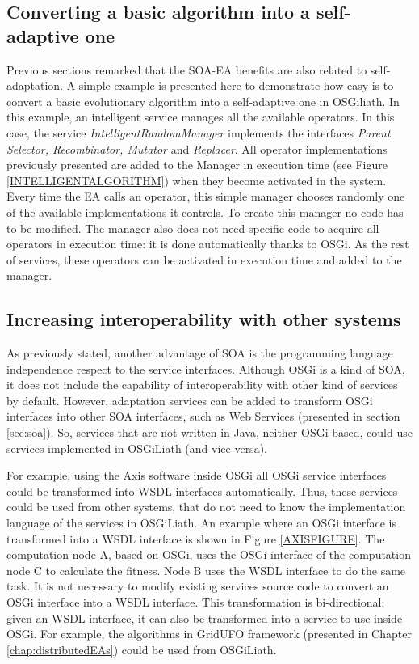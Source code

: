 \subsection{Converting a basic algorithm into a self-adaptive one}

Previous sections remarked that the SOA-EA benefits are also related to self-adaptation. A simple example is presented here to demonstrate how easy is to convert a basic evolutionary algorithm into a self-adaptive one in OSGiliath. In this example, an intelligent service manages all the available operators. In this case, the service {\em IntelligentRandomManager} implements the interfaces {\em Parent Selector, Recombinator, Mutator} and {\em Replacer}. All operator implementations previously presented are added to the Manager in execution time (see Figure \ref{INTELLIGENTALGORITHM}) when they become activated in the system. Every time the EA calls an operator, this simple manager chooses randomly one of the available implementations it controls. To create this manager no code has to be modified. The manager also does not need specific code to acquire all operators in execution time: it is done automatically thanks to OSGi. As the rest of services, these operators can be activated in execution time and added to the manager. 



\subsection{Increasing interoperability with other systems}

As previously stated, another advantage of SOA is the programming language independence respect to the service interfaces. Although OSGi is a kind of SOA, it does not include  the capability of interoperability with other kind of services by default. However, adaptation services can be added to transform OSGi interfaces into other SOA interfaces, such as Web Services (presented in section \ref{sec:soa}). So, services that are not written in Java, neither OSGi-based, could use services implemented in OSGiLiath (and vice-versa).

For example, using the Axis software inside OSGi all OSGi service interfaces could be transformed into WSDL interfaces automatically. Thus, these services could be used from other systems, that do not need to know the implementation language of the services in OSGiLiath. An example where an OSGi interface is transformed into a WSDL interface is shown in Figure \ref{AXISFIGURE}. The computation node A, based on OSGi, uses the OSGi interface of the computation node C to calculate the fitness. Node B uses the WSDL interface to do the same task. It is not necessary to modify existing services source code to convert an OSGi interface into a WSDL interface. This transformation is bi-directional: given an WSDL interface, it can also be transformed into a service to use inside OSGi. For example, the algorithms in GridUFO framework (presented in Chapter \ref{chap:distributedEAs}) could be used from OSGiLiath.






